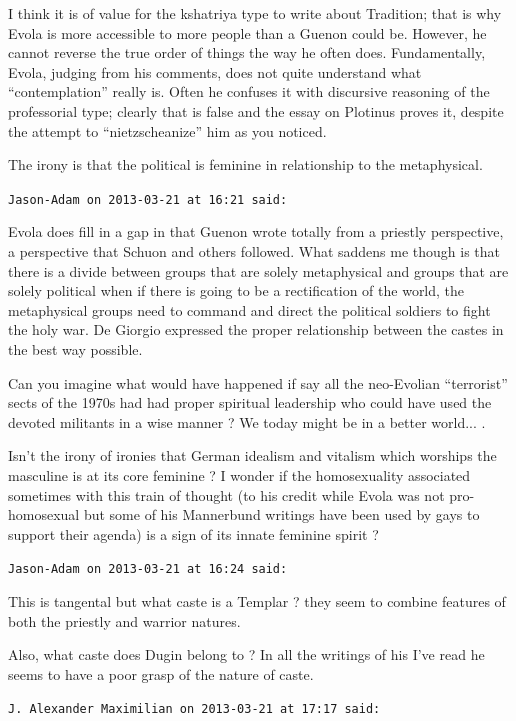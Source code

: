 \begin{footnotesize}
\begin{sffamily}
I think it is of value for the kshatriya type to write about Tradition; that is why Evola is more accessible to more people than a Guenon could be. However, he cannot reverse the true order of things the way he often does. Fundamentally, Evola, judging from his comments, does not quite understand what ``contemplation'' really is. Often he confuses it with discursive reasoning of the professorial type; clearly that is false and the essay on Plotinus proves it, despite the attempt to ``nietzscheanize'' him as you noticed.

The irony is that the political is feminine in relationship to the metaphysical.

\hfill

\texttt{Jason-Adam on 2013-03-21 at 16:21 said:}

Evola does fill in a gap in that Guenon wrote totally from a priestly perspective, a perspective that Schuon and others followed. What saddens me though is that there is a divide between groups that are solely metaphysical and groups that are solely political when if there is going to be a rectification of the world, the metaphysical groups need to command and direct the political soldiers to fight the holy war. De Giorgio expressed the proper relationship between the castes in the best way possible.

Can you imagine what would have happened if say all the neo-Evolian ``terrorist'' sects of the 1970s had had proper spiritual leadership who could have used the devoted militants in a wise manner ? We today might be in a better world... .

Isn't the irony of ironies that German idealism and vitalism which worships the masculine is at its core feminine ? I wonder if the homosexuality associated sometimes with this train of thought (to his credit while Evola was not pro-homosexual but some of his Mannerbund writings have been used by gays to support their agenda) is a sign of its innate feminine spirit ?

\hfill

\texttt{Jason-Adam on 2013-03-21 at 16:24 said:}

This is tangental but what caste is a Templar ? they seem to combine features of both the priestly and warrior natures.

Also, what caste does Dugin belong to ? In all the writings of his I've read he seems to have a poor grasp of the nature of caste.

\hfill

\texttt{J. Alexander Maximilian on 2013-03-21 at 17:17 said:}


\end{sffamily}
\end{footnotesize}
